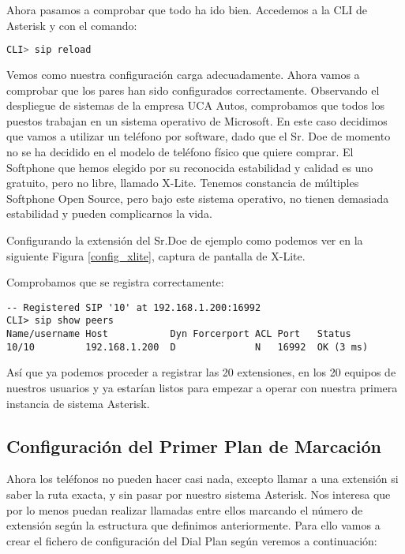 Ahora pasamos a comprobar que todo ha ido bien. Accedemos a la CLI de Asterisk y con el comando:

\begin{lstlisting}[language=sh]
CLI> sip reload
\end{lstlisting}

Vemos como nuestra configuración carga adecuadamente. Ahora vamos a comprobar que los pares han sido configurados correctamente. Observando el despliegue de sistemas de la empresa UCA Autos, comprobamos que todos los puestos trabajan en un sistema operativo de Microsoft. En este caso decidimos que vamos a utilizar un teléfono por software, dado que el Sr. Doe de momento no se ha decidido en el modelo de teléfono físico que quiere comprar. El Softphone que hemos elegido por su reconocida estabilidad y calidad es uno gratuito, pero no libre, llamado X-Lite. Tenemos constancia de múltiples Softphone Open Source, pero bajo este sistema operativo, no tienen demasiada estabilidad y pueden complicarnos la vida.

Configurando la extensión del Sr.Doe de ejemplo como podemos ver en la siguiente Figura \ref{config_xlite}, captura de pantalla de X-Lite.


Comprobamos que se registra correctamente:

\begin{lstlisting}[style=consola]
-- Registered SIP '10' at 192.168.1.200:16992
CLI> sip show peers
Name/username Host           Dyn Forcerport ACL Port   Status
10/10         192.168.1.200  D              N   16992  OK (3 ms)
\end{lstlisting}

Así que ya podemos proceder a registrar las 20 extensiones, en los 20 equipos de nuestros usuarios y ya estarían listos para empezar a operar con nuestra primera instancia de sistema Asterisk.

\newpage

\subsection{Configuración del Primer Plan de Marcación}

Ahora los teléfonos no pueden hacer casi nada, excepto llamar a una extensión si saber la ruta exacta, y sin pasar por nuestro sistema Asterisk. Nos interesa que por lo menos puedan realizar llamadas entre ellos marcando el número de extensión según la estructura que definimos anteriormente. Para ello vamos a crear el fichero de configuración del Dial Plan según veremos a continuación:

